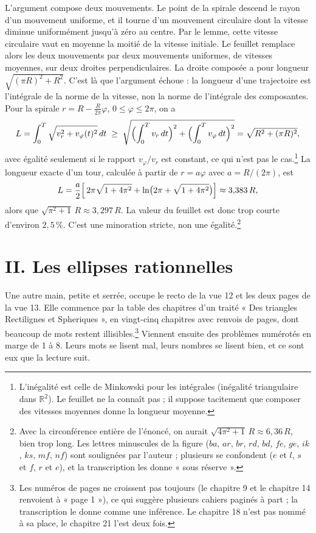 \documentclass[11pt,a4paper]{article}
\begin{document}
L'argument compose deux mouvements. Le point de la spirale descend le rayon
d'un mouvement uniforme, et il tourne d'un mouvement circulaire dont la vitesse
diminue uniformément jusqu'à zéro au centre. Par le lemme, cette vitesse
circulaire vaut en moyenne la moitié de la vitesse initiale. Le feuillet
remplace alors les deux mouvements par deux mouvements uniformes, de vitesses
moyennes, sur deux droites perpendiculaires. La droite composée a pour longueur
\(\sqrt{(\pi R)^2+R^2}\). C'est là que l'argument échoue : la longueur d'une
trajectoire est l'intégrale de la norme de la vitesse, non la norme de
l'intégrale des composantes. Pour la spirale \(r=R-\frac{R}{2\pi}\varphi\),
\(0\le\varphi\le2\pi\), on a
\[
L=\int_0^{T}\sqrt{v_r^2+v_\varphi(t)^2}\,dt\;\ge\;\sqrt{\Bigl(\int_0^T v_r\,dt\Bigr)^2+\Bigl(\int_0^T v_\varphi\,dt\Bigr)^2}=\sqrt{R^2+(\pi R)^2},
\]
avec égalité seulement si le rapport \(v_\varphi/v_r\) est constant, ce qui
n'est pas le cas.\footnote{L'inégalité est celle de Minkowski pour les
intégrales (inégalité triangulaire dans \(\mathbb R^2\)). Le feuillet ne la
connaît pas ; il suppose tacitement que composer des vitesses moyennes donne la
longueur moyenne.} La longueur exacte d'un tour, calculée à partir de
\(r=a\varphi\) avec \(a=R/(2\pi)\), est
\[
L=\frac{a}{2}\Bigl[\,2\pi\sqrt{1+4\pi^2}+\ln\bigl(2\pi+\sqrt{1+4\pi^2}\bigr)\Bigr]\approx 3{,}383\,R,
\]
alors que \(\sqrt{\pi^2+1}\,R\approx3{,}297\,R\). La valeur du feuillet est donc
trop courte d'environ \(2{,}5\,\%\). C'est une minoration stricte, non une
égalité.\footnote{Avec la circonférence entière de l'énoncé, on aurait
\(\sqrt{4\pi^2+1}\,R\approx6{,}36\,R\), bien trop long. Les lettres minuscules
de la figure (\(ba\), \(ar\), \(br\), \(rd\), \(bd\), \(fe\), \(ge\), \(ik\),
\(ks\), \(mf\), \(nf\)) sont soulignées par l'auteur ; plusieurs se confondent
(\(e\) et \(l\), \(s\) et \(f\), \(r\) et \(e\)), et la transcription les donne
« sous réserve ».}

\section*{II. Les ellipses rationnelles}

Une autre main, petite et serrée, occupe le recto de la vue 12 et les deux pages
de la vue 13. Elle commence par la table des chapitres d'un traité « Des
triangles Rectilignes et Spheriques », en vingt-cinq chapitres avec renvois de
pages, dont beaucoup de mots restent illisibles.\footnote{Les numéros de pages
ne croissent pas toujours (le chapitre 9 et le chapitre 14 renvoient à
« page 1 »), ce qui suggère plusieurs cahiers paginés à part ; la transcription
le donne comme une inférence. Le chapitre 18 n'est pas nommé à sa place, le
chapitre 21 l'est deux fois.} Viennent ensuite des problèmes numérotés en
marge de 1 à 8. Leurs mots se lisent mal, leurs nombres se lisent bien, et ce
sont eux que la lecture suit.
\end{document}

